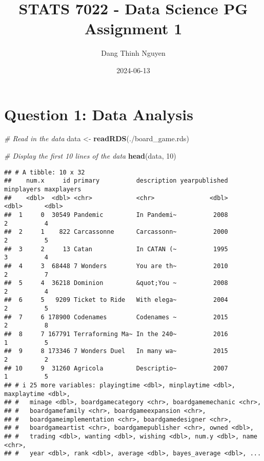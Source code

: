\documentclass[
]{article}
\title{STATS 7022 - Data Science PG Assignment 1}
\author{Dang Thinh Nguyen}
\date{2024-06-13}
\newenvironment{Shaded}{\begin{snugshade}}{\end{snugshade}}
\newcommand{\CommentTok}[1]{\textcolor[rgb]{0.56,0.35,0.01}{\textit{#1}}}
\newcommand{\DecValTok}[1]{\textcolor[rgb]{0.00,0.00,0.81}{#1}}
\newcommand{\FunctionTok}[1]{\textcolor[rgb]{0.13,0.29,0.53}{\textbf{#1}}}
\newcommand{\NormalTok}[1]{#1}
\newcommand{\OtherTok}[1]{\textcolor[rgb]{0.56,0.35,0.01}{#1}}
\newcommand{\StringTok}[1]{\textcolor[rgb]{0.31,0.60,0.02}{#1}}
\begin{document}
\maketitle

\hypertarget{question-1-data-analysis}{%
\section{\texorpdfstring{\textbf{Question 1: Data Analysis}}{Question 1: Data Analysis}}\label{question-1-data-analysis}}

\begin{Shaded}
\begin{Highlighting}[]
\CommentTok{\# Read in the data}
\NormalTok{data }\OtherTok{\textless{}{-}} \FunctionTok{readRDS}\NormalTok{(}\StringTok{\textquotesingle{}./board\_game.rds\textquotesingle{}}\NormalTok{)}

\CommentTok{\# Display the first 10 lines of the data}
\FunctionTok{head}\NormalTok{(data, }\DecValTok{10}\NormalTok{)}
\end{Highlighting}
\end{Shaded}

\begin{verbatim}
## # A tibble: 10 x 32
##    num.x     id primary          description yearpublished minplayers maxplayers
##    <dbl>  <dbl> <chr>            <chr>               <dbl>      <dbl>      <dbl>
##  1     0  30549 Pandemic         In Pandemi~          2008          2          4
##  2     1    822 Carcassonne      Carcassonn~          2000          2          5
##  3     2     13 Catan            In CATAN (~          1995          3          4
##  4     3  68448 7 Wonders        You are th~          2010          2          7
##  5     4  36218 Dominion         &quot;You ~          2008          2          4
##  6     5   9209 Ticket to Ride   With elega~          2004          2          5
##  7     6 178900 Codenames        Codenames ~          2015          2          8
##  8     7 167791 Terraforming Ma~ In the 240~          2016          1          5
##  9     8 173346 7 Wonders Duel   In many wa~          2015          2          2
## 10     9  31260 Agricola         Descriptio~          2007          1          5
## # i 25 more variables: playingtime <dbl>, minplaytime <dbl>, maxplaytime <dbl>,
## #   minage <dbl>, boardgamecategory <chr>, boardgamemechanic <chr>,
## #   boardgamefamily <chr>, boardgameexpansion <chr>,
## #   boardgameimplementation <chr>, boardgamedesigner <chr>,
## #   boardgameartist <chr>, boardgamepublisher <chr>, owned <dbl>,
## #   trading <dbl>, wanting <dbl>, wishing <dbl>, num.y <dbl>, name <chr>,
## #   year <dbl>, rank <dbl>, average <dbl>, bayes_average <dbl>, ...
\end{verbatim}
\end{document}
